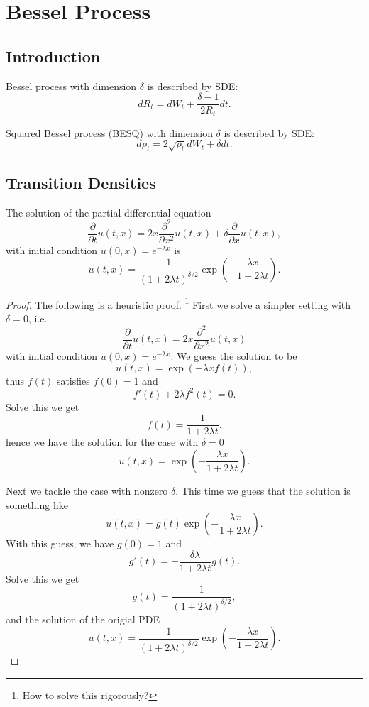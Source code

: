 \chapter{Bessel Process}

\section{Introduction}
Bessel process with dimension $\delta$ is described by SDE:
\begin{equation}
  dR_t = dW_t + \frac{\delta-1}{2R_t} dt.
\end{equation}

Squared Bessel process (BESQ) with dimension $\delta$ is described by SDE:
\begin{equation}
  d\rho_t = 2\sqrt{\rho_t} dW_t + \delta dt.
\end{equation}

\section{Transition Densities}

\begin{lemma} \label{L:pde_besq}
The solution of the partial differential equation
\begin{equation}
  \frac{\partial}{\partial t} u(t,x) = 2x \frac{\partial^2}{\partial x^2} u(t,x)
                                  + \delta \frac{\partial}{\partial x} u(t,x),
\end{equation}
with initial condition $u(0,x)=e^{-\lambda x}$ is
\begin{equation}
  u(t,x) = \frac{1}{(1+2\lambda t)^{\delta /2}} 
           \exp \left(-\frac{\lambda x}{1+2\lambda t} \right).
\end{equation}
\end{lemma}
\begin{proof}
The following is a heuristic proof.
\footnote{How to solve this rigorously?}
First we solve a simpler setting with $\delta=0$, i.e.
\[
  \frac{\partial}{\partial t} u(t,x) = 2x \frac{\partial^2}{\partial x^2} u(t,x)
\]
with initial condition $u(0,x)=e^{-\lambda x}$. We guess the solution to be
\[
  u(t,x) = \exp \left( -\lambda x f(t) \right),
\]
thus $f(t)$ satisfies $f(0)=1$ and
\[
  f'(t)+2\lambda f^2(t) = 0.
\]
Solve this we get
\[
  f(t) = \frac{1}{1+2\lambda t}.
\]
hence we have the solution for the case with $\delta=0$
\[
  u(t,x) = \exp \left(-\frac{\lambda x}{1+2\lambda t} \right).
\]

Next we tackle the case with nonzero $\delta$. This time we guess that the
solution is something like
\[
  u(t,x) = g(t) \exp \left(-\frac{\lambda x}{1+2\lambda t} \right).
\]
With this guess, we have $g(0)=1$ and
\[
  g'(t) = -\frac{\delta \lambda}{1+2\lambda t} g(t).
\]
Solve this we get
\[
  g(t) = \frac{1}{(1+2\lambda t)^{\delta /2}}, 
\]
and the solution of the origial PDE
\[
  u(t,x) = \frac{1}{(1+2\lambda t)^{\delta /2}} 
           \exp \left(-\frac{\lambda x}{1+2\lambda t} \right).
\]
\end{proof}

